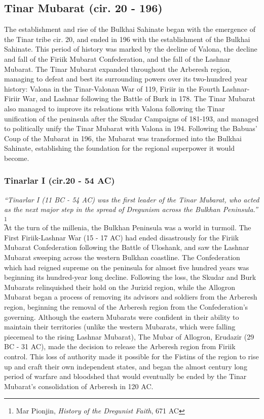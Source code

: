 	\subsection{Tinar Mubarat (cir. 20 - 196)}				
		The establishment and rise of the Bulkhai Sahinate began with the emergence of the Tinar tribe cir. 20, and ended in 196 with the establishment of the Bulkhai Sahinate. This period of history was marked by the decline of Valona, the decline and fall of the Firiik Mubarat Confederation, and the fall of the Lashnar Mubarat. The Tinar Mubarat expanded throughout the Arberesh region, managing to defeat and best its surrounding powers over its two-hundred year history: Valona in the Tinar-Valonan War of 119, Firiir in the Fourth Lashnar-Firiir War, and Lashnar following the Battle of Burk in 178. The Tinar Mubarat also managed to improve its relsations with Valona following the Tinar unification of the peninsula after the Skudar Campaigns of 181-193, and managed to politically unify the Tinar Mubarat with Valona in 194. Following the Babuas' Coup of the Mubarat in 196, the Mubarat was transformed into the Bulkhai Sahinate, establishing the foundation for the regional superpower it would become.
		\subsubsection{Tinarlar I (cir.20 - 54 AC)}
			\textit{``Tinarlar I (11 BC - 54 AC) was the first leader of the Tinar Mubarat, who acted as the next major step in the spread of Dregunism across the Bulkhan Peninsula.''} \footnote{Mar Pionjin, \textit{History of the Dregunist Faith}, 671 AC}\\

			At the turn of the millenia, the Bulkhan Peninsula was a world in turmoil. The First Firiik-Lashnar War (15 - 17 AC) had ended disastrously for the Firiik Mubarat Confederation following the Battle of Uloshank, and saw the Lashnar Mubarat sweeping across the western Bulkhan coastline. The Confederation which had reigned supreme on the peninsula for almost five hundred years was beginning its hundred-year long decline. Following the loss, the Skudar and Burk Mubarats relinquished their hold on the Jurizid region, while the Allogron Mubarat began a process of removing its advisors and soldiers from the Arberesh region, beginning the removal of the Arberesh region from the Confederation's governing. Although the eastern Mubarats were confident in their ability to maintain their territories (unlike the western Mubarats, which were falling piecemeal to the rising Lashnar Mubarat), The Mubar of Allogron, Erudazir (29 BC - 31 AC), made the decision to release the Arberesh region from Firiik control. This loss of authority made it possible for the Fistins of the region to rise up and craft their own independent states, and began the almost century long period of warfare and bloodshed that would eventually be ended by the Tinar Mubarat's consolidation of Arberesh in 120 AC. 
			

